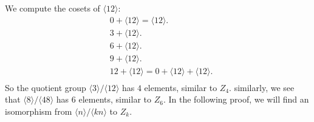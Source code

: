 \documentclass[a4paper,12pt]{article}
\begin{document}
    We compute the cosets of $\langle 12 \rangle:$
    \begin{align*}
        &0+\langle 12 \rangle=\langle 12 \rangle.\\
        &3+\langle 12 \rangle.\\
        &6+\langle 12 \rangle.\\
        &9+\langle 12 \rangle.\\
        &12+\langle 12 \rangle=0+\langle 12 \rangle+\langle 12 \rangle.\\
    \end{align*}
So the quotient group $\langle 3 \rangle / \langle 12 \rangle$ has $4$ elements, similar to $Z_4.$
similarly, we see that $\langle 8 \rangle/\langle 48 \rangle$ has $6$ elements, similar to $Z_6.$
In the following proof, we will find an isomorphism from $\langle n \rangle/ \langle kn \rangle$ to $Z_k.$
\end{document}
